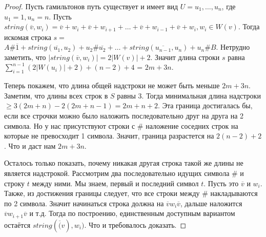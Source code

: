 \documentclass[a4paper,10pt]{article}
\begin{document}
\begin{proof}
Пусть гамильтонов путь существует и имеет вид $U = u_1, \dots, u_n$, где $u_1 = 1, u_n = n$.
Пусть $string(\overline{v}, w_i) = \overline{v} + w_i + \overline{v} + w_{i+1} + \dots + \overline{v} + w_{i-1} + \overline{v} + w_i, w_i \in W(v)$.
Тогда искомая строка $s = $ $A\#\overline{1} + string(\overline{u_1}, u_2) + u_2 \# \overline{u_2} + \dots + string(\overline{u_{n-1}}, u_n) + u_n \# B$.
Нетрудно заметить, что $|string(\overline{v}, w_i)| = 2|W(v)| + 2$. 
Значит длина строки $s$ равна $\sum\limits_{i=1}^{n-1} (2|W(u_i)| + 2) + (n - 2) + 4$ = $2m + 3n$. 

Теперь покажем, что длина общей надстроки не может быть меньше $2m + 3n$.
Заметим, что длины всех строк в $S$ равны 3.
Тогда минимальная длина надстроки $\geq 3(2m + n) - 2(2m + n - 1) = 2m + n + 2$.
Эта граница достигалась бы, если все строчки можно было наложить последовательно друг на друга на 2 символа.
Но у нас присутствуют строки с $\#$ наложение соседних строк на которые не превосходит 1 символа.
Значит, граница разрастется на $2(n - 2) + 2$.
Что и даст нам $2m + 3n$.

Осталось только показать, почему никакая другая строка такой же длины не является надстрокой.
Рассмотрим два последовательно идущих символа \# и строку $t$ между ними.
Мы знаем, первый и последний символ $t$.
Пусть это $\overline{v}$ и $w_i$.
Также, из достижения границы следует, что все строки между \# накладываются по 2 символа.
Значит начинаться строка должна на $\overline{v} w_i \overline{v}$, дальше наложится $\overline{v} w_{i+1} \overline{v}$ и т.д.
Тогда по построению, единственным доступным вариантом остаётся $string(\overline(v), w_i)$.
Что и требовалось доказать.
\end{proof}
\end{document}
